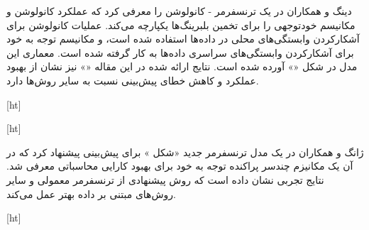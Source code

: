 دینگ و همکاران در  یک ترنسفرمر - کانولوشن را معرفی کرد که عملکرد کانولوشن و مکانیسم خودتوجهی را برای تخمین  بلبرینگ‌ها یکپارچه می‌کند. عملیات کانولوشن برای آشکارکردن وابستگی‌های محلی در داده‌ها استفاده شده است، و مکانیسم توجه به خود برای آشکارکردن وابستگی‌های سراسری داده‌ها به کار گرفته شده است. معماری این مدل در شکل «» آورده شده است. نتایج ارائه شده در این مقاله «» نیز نشان از بهبود عملکرد و کاهش خطای پیش‌بینی نسبت به سایر روش‌ها دارد.




[ht]



[ht]




ژانگ و همکاران در  یک مدل ترنسفرمر جدید «شکل » برای پیش‌بینی  پیشنهاد کرد که در آن یک مکانیزم چندسر پراکنده توجه به خود برای بهبود کارایی محاسباتی معرفی شد. نتایج تجربی نشان داده است که روش پیشنهادی از ترنسفرمر معمولی و سایر روش‌های مبتنی بر داده بهتر عمل می‌کند.


[ht]




























































